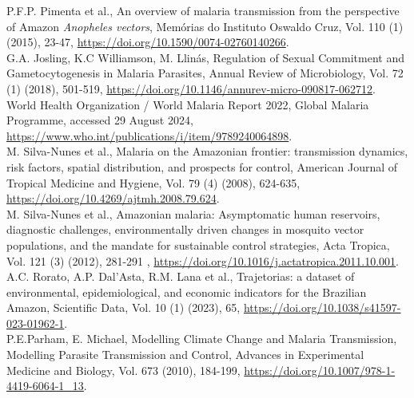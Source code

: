 \documentclass[a4paper,fleqn]{cas-dc}
\begin{document}
 \begin{thebibliography}{00}


 P.F.P. Pimenta et al., An overview of malaria transmission from the perspective of Amazon \emph{Anopheles vectors}, Memórias do Instituto Oswaldo Cruz, Vol. 110 (1) (2015), 23-47, \href{https://doi.org/10.1590/0074-02760140266}{https://doi.org/10.1590/0074-02760140266}.
\\
 G.A. Josling, K.C Williamson, M. Llinás, Regulation of Sexual Commitment and Gametocytogenesis in Malaria Parasites, Annual Review of Microbiology, Vol. 72 (1) (2018), 501-519, \href{https://doi.org/10.1146/annurev-micro-090817-062712}{https://doi.org/10.1146/annurev-micro-090817-062712}.
\\
 World Health Organization / World Malaria Report 2022, Global Malaria Programme, accessed 29 August 2024, \href{https://www.who.int/publications/i/item/9789240064898}{https://www.who.int/publications/i/item/9789240064898}.
\\
 M. Silva-Nunes et al., Malaria on the Amazonian frontier: transmission dynamics, risk factors, spatial distribution, and prospects for control, American Journal of Tropical Medicine and Hygiene, Vol. 79 (4) (2008), 624-635, \href{https://doi.org/10.4269/ajtmh.2008.79.624}{https://doi.org/10.4269/ajtmh.2008.79.624}. 
\\
 M. Silva-Nunes et al.,  Amazonian malaria: Asymptomatic human reservoirs, diagnostic challenges, environmentally driven changes in mosquito vector populations, and the mandate for sustainable control strategies, Acta Tropica, Vol. 121 (3) (2012), 281-291 , \href{https://doi.org/10.1016/j.actatropica.2011.10.001}{https://doi.org/10.1016/j.actatropica.2011.10.001}.
\\
 A.C. Rorato, A.P. Dal’Asta, R.M. Lana et al., Trajetorias: a dataset of environmental, epidemiological, and economic indicators for the Brazilian Amazon, Scientific Data, Vol. 10 (1) (2023), 65, \href{https://doi.org/10.1038/s41597-023-01962-1}{https://doi.org/10.1038/s41597-023-01962-1}.
\\
 P.E.Parham, E. Michael, Modelling Climate Change and Malaria Transmission, Modelling Parasite Transmission and Control, Advances in Experimental Medicine and Biology, Vol. 673 (2010), 184-199, \href{https://doi.org/10.1007/978-1-4419-6064-1_13}{https://doi.org/10.1007/978-1-4419-6064-1\_13}.

\end{thebibliography}
\end{document}
